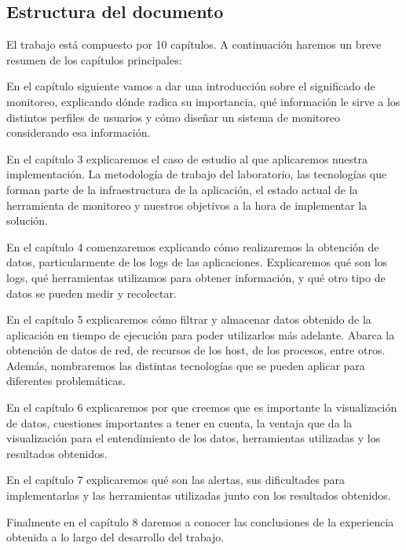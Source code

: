 \subsection{Estructura del documento}
\label{estructura}
El trabajo está compuesto por 10 capítulos. A continuación haremos un breve
resumen de los capítulos principales:

En el capítulo siguiente vamos a dar una introducción sobre el significado de
monitoreo, explicando dónde radica su importancia, qué información le sirve a
los distintos perfiles de usuarios y cómo diseñar un sistema de monitoreo
considerando esa información.

En el capítulo 3 explicaremos el caso de estudio al que aplicaremos nuestra
implementación. La metodología de trabajo del laboratorio, las tecnologías que
forman parte de la infraestructura de la aplicación, el estado actual de la
herramienta de monitoreo y nuestros objetivos a la hora de implementar la
solución.

En el capítulo 4 comenzaremos explicando cómo realizaremos la obtención de
datos, particularmente de los logs de las aplicaciones. Explicaremos qué son
los logs, qué herramientas utilizamos para obtener información, y qué otro tipo
de datos se pueden medir y recolectar.

En el capítulo 5 explicaremos cómo filtrar y almacenar datos obtenido de la
aplicación en tiempo de ejecución para poder utilizarlos más adelante. Abarca
la obtención de datos de red, de recursos de los host, de los procesos, entre
otros. Además, nombraremos las distintas tecnologías que se pueden aplicar para
diferentes problemáticas.

En el capítulo 6 explicaremos por que creemos que es importante la
visualización de datos, cuestiones importantes a tener en cuenta, la ventaja
que da la visualización para el entendimiento de los datos, herramientas
utilizadas y los resultados obtenidos.

En el capítulo 7 explicaremos qué son las alertas, sus dificultades para
implementarlas  y las herramientas utilizadas junto con los resultados
obtenidos.

Finalmente en el capítulo 8 daremos a conocer las conclusiones de la
experiencia obtenida a lo largo del desarrollo del trabajo.

